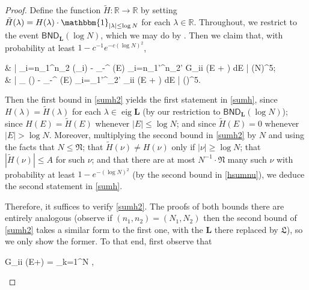 \documentclass{amsart}
\numberwithin{equation}{section}
\DeclareMathOperator{\eig}{eig}
\DeclareMathOperator{\Imaginary}{Im}
\theoremstyle{remark}
\theoremstyle{definition}
\begin{document}
	\begin{proof}
		
		Define the function $\tilde{H} : \mathbb{R} \rightarrow \mathbb{R}$ by setting $\tilde{H}(\lambda) = H(\lambda) \cdot \mathbbm{1}_{|\lambda| \le \log N}$ for each $\lambda \in \mathbb{R}$. Throughout, we restrict to the event $\mathsf{BND}_{\bm{L}} (\log N)$, which we may do by . Then we claim that, with probability at least $1 - c^{-1} e^{-c(\log N)^2}$,
		\begin{flalign}
			\label{sumh2} 
			\begin{aligned} 
				& \Bigg| \displaystyle{} \displaystyle\sum_{i=n_1}^{n_2}   (\Lambda_i) - \displaystyle{} \displaystyle\int_{-\infty}^{\infty} (E) \displaystyle\sum_{i=n_1'}^{n_2'} \Imaginary G_{ii} (E +  \eta) dE \Bigg| \le \displaystyle{} \cdot (\log N)^5; \\
				& \Bigg| \displaystyle{} \displaystyle\sum_{\nu \in \eig {}} (\nu) - \displaystyle{} \displaystyle\int_{-\infty}^{\infty}  (E) \displaystyle\sum_{i=\mathfrak{N}_1'}^{_2'} \Imaginary {}_{ii} (E +  \eta) dE \Bigg| \le \displaystyle{} \cdot (\log {})^5.
			\end{aligned} 
		\end{flalign}
		
		\noindent Then the first bound in \eqref{sumh2} yields the first statement in \eqref{sumh}, since $H(\lambda) = \tilde{H}(\lambda)$ for each $\lambda \in \eig \bm{L}$ (by our restriction to $\mathsf{BND}_{\bm{L}} (\log N)$); since $H(E) = \tilde{H}(E)$ whenever $|E| \le \log N$; and since $\tilde{H}(E) = 0$ whenever $|E| > \log N$. Moreover, multiplying the second bound in \eqref{sumh2} by $N$ and using the facts that $N \le \mathfrak{N}$; that $\tilde{H} (\nu) \ne H(\nu)$ only if $|\nu| \ge \log N$; that $| \tilde{H}(\nu) | \le A$ for such $\nu$; and that there are at most $N^{-1} \cdot \mathfrak{N}$ many such $\nu$ with probability at least $1 - e^{-(\log N)^2}$ (by the second bound in \eqref{hsumnu}), we deduce the second statement in \eqref{sumh}. 
		
		Therefore, it suffices to verify \eqref{sumh2}. The proofs of both bounds there are entirely analogous (observe if $(n_1, n_2) = (N_1, N_2)$ then the second bound of \eqref{sumh2} takes a similar form to the first one, with the $\bm{L}$ there replaced by $\bm{\mathfrak{L}}$), so we only show the former. To that end, first observe that
		\begin{flalign*}
			G_{ii} (E+\eta) = \displaystyle\sum_{k=1}^N \displaystyle{},
		\end{flalign*}
		

\end{proof}
\end{document}
